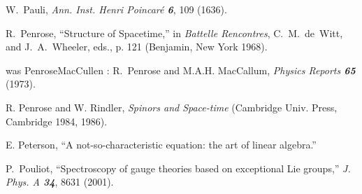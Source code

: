 

 W.~Pauli,
    {\em Ann. Inst. Henri Poincar{\'e}  \bf 6}, 109 (1636).

 R.~Penrose,
    ``Structure of Spacetime,''
     in {\em Battelle Rencontres},
     C.~M.~de~Witt, and J.~A.~Wheeler, eds., p. 121
    (Benjamin, New York 1968).

%

was PenroseMacCullen :
 R.~Penrose and M.A.H. MacCallum,
    {\em Physics Reports \bf 65} (1973).

 R. Penrose and W. Rindler,
    {\em Spinors and Space-time}
    (Cambridge Univ. Press, Cambridge 1984, 1986).


 E. Peterson,
        ``A not-so-characteristic equation: the art of linear algebra.''

P.~Pouliot,
``Spectroscopy of gauge theories based on exceptional Lie groups,''
{\em J. Phys. A  \bf 34},  8631 (2001).


